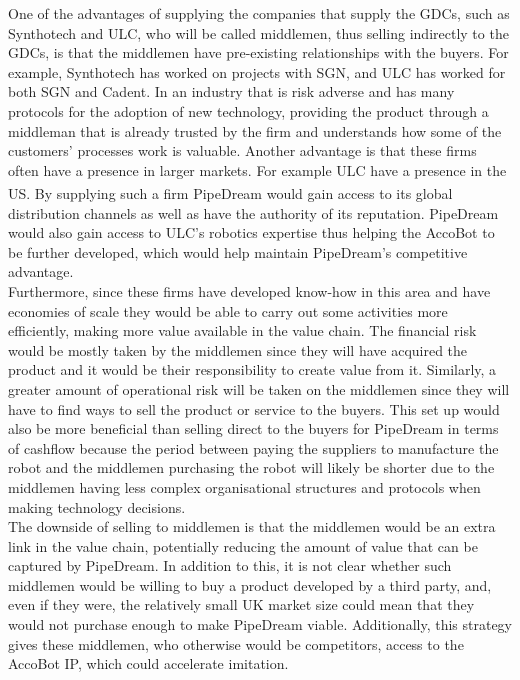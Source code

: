 \documentclass[11pt]{article}		%
\newcommand{\supercite}[1]{\textsuperscript{\cite{#1}}}		%
\begin{document}
     One of the advantages of supplying the companies that supply the GDCs, such as Synthotech and ULC, who will be called middlemen, thus selling indirectly to the GDCs, is that the middlemen have pre-existing relationships with the buyers. For example, Synthotech has worked on projects with SGN, and ULC has worked for both SGN and Cadent. In an industry that is risk adverse and has many protocols for the adoption of new technology, providing the product through a middleman that is already trusted by the firm and understands how some of the customers’ processes work is valuable. Another advantage is that these firms often have a presence in larger markets. For example ULC have a presence in the US\supercite{SPX_acquisition}. By supplying such a firm PipeDream would gain access to its global distribution channels as well as have the authority of its reputation. PipeDream would also gain access to ULC’s robotics expertise thus helping the AccoBot to be further developed, which would help maintain PipeDream's competitive advantage.
    \\
    \hspace*{2ex}Furthermore, since these firms have developed know-how in this area and have economies of scale they would be able to carry out some activities more efficiently, making more value available in the value chain. The financial risk would be mostly taken by the middlemen since they will have acquired the product and it would be their responsibility to create value from it. Similarly, a greater amount of operational risk will be taken on the middlemen since they will have to find ways to sell the product or service to the buyers. This set up would also be more beneficial than selling direct to the buyers for PipeDream in terms of cashflow because the period between paying the suppliers to manufacture the robot and the middlemen purchasing the robot will likely be shorter due to the middlemen having less complex organisational structures and protocols when making technology decisions. 
    \\
    \hspace*{2ex}The downside of selling to middlemen is that the middlemen would be an extra link in the value chain, potentially reducing the amount of value that can be captured by PipeDream. In addition to this, it is not clear whether such middlemen would be willing to buy a product developed by a third party, and, even if they were, the relatively small UK market size could mean that they would not purchase enough to make PipeDream viable. Additionally, this strategy gives these middlemen, who otherwise would be competitors, access to the AccoBot IP, which could accelerate imitation.
\end{document}
